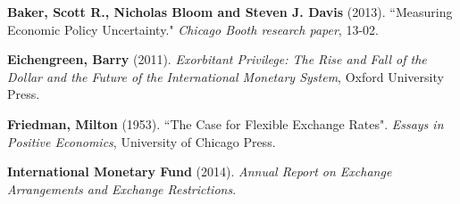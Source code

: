 \documentclass[11pt,a4paper]{article}
\begin{document}
\vspace*{0.5cm}
\begin{thebibliography}{9}
	 \textbf{Baker, Scott R., Nicholas Bloom and Steven J. Davis} (2013). ``Measuring Economic Policy Uncertainty." \textit{Chicago Booth research paper}, 13-02.	

	 \textbf{Eichengreen, Barry} (2011). \textit{Exorbitant Privilege: The Rise and Fall of the Dollar and the Future of the International Monetary System}, Oxford University Press.

	 \textbf{Friedman, Milton} (1953). ``The Case for Flexible Exchange Rates". \textit{Essays in Positive Economics}, University of Chicago Press.

	 \textbf{International Monetary Fund} (2014). \textit{Annual Report on Exchange Arrangements and Exchange Restrictions}.

\end{thebibliography}



\end{document}
